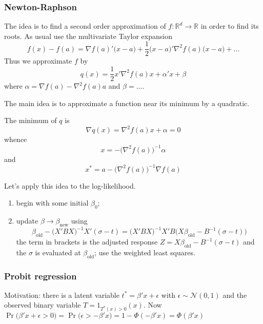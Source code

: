 \documentclass[a4paper]{article}
\newcommand{\Real}{\mathbb{R}}
\newcommand{\Ncal}{\mathcal{N}}
\begin{document}
\subsubsection{Newton-Raphson} %
\label{ssub:newton_raphson}

The idea is to find a second order approximation of $f:\Real^d\to \Real$ in order to find its roots. As usual use the multivariate Taylor expansion
\[f(x)-f(a)  = \nabla f(a)' \big(x-a\big) + \frac{1}{2}\big(x-a\big)'\nabla^2 f(a) \big(x-a\big) + \ldots \]
Thus we approximate $f$ by 
\[q(x) = \frac{1}{2}x'\nabla^2 f(a) x + \alpha' x + \beta\]
where $\alpha = \nabla f(a) - \nabla^2 f(a)a$ and $\beta = \ldots$.

The main idea is to approximate a function near its minimum by a quadratic.

The minimum of $q$ is
\[\nabla q(x) = \nabla^2 f(a) x + \alpha = 0\]
whence 
\[ x = -\big(\nabla^2 f(a)\big)^{-1} \alpha \]
and 
\[ x^* = a - \big(\nabla^2 f(a)\big)^{-1} \nabla f(a) \]

Let's apply this idea to the log-likelihood.
\begin{enumerate}
	\item begin with some initial $\beta_0$;
	\item update $\beta\to \beta_{\text{new}}$ using
	\[\beta_{\text{old}} - \big(X'BX\big)^{-1} X'(\sigma - t) = \big(X'BX\big)^{-1} X'B \big( X \beta_{\text{old}} - B^{-1} (\sigma- t ) \big)\]
	the term in brackets is the adjusted response $Z = X \beta_{\text{old}} - B^{-1} (\sigma - t )$ and the $\sigma$ is evaluated at $\beta_{\text{old}}$;
	use the weighted least squares.
\end{enumerate}



\subsubsection{Probit regression} %
\label{ssub:probit_regression}

Motivation: there is a latent variable $t^* = \beta'x + \epsilon$ with $\epsilon\sim \Ncal(0,1)$ and the observed binary variable $T = 1_{T^*(x)>0}(x)$.
Now $\Pr\big(\beta'x+\epsilon > 0\big) = \Pr\big(\epsilon > -\beta'x\big) = 1-\Phi(-\beta'x) = \Phi(\beta'x)$




\end{document}
